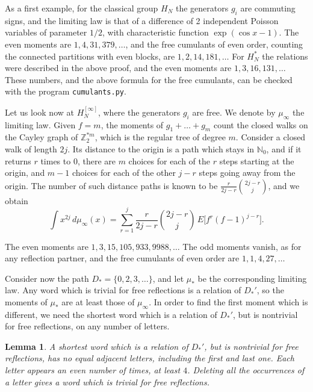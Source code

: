 \documentclass[11pt,a4paper]{article}
\newtheorem{lem}[thm]{Lemma}
\begin{document}
As a first example, for the classical group $H_N$ the generators $g_i$ are commuting signs, and the limiting law is that of a difference of 2 independent Poisson variables of parameter $1/2$, with characteristic function $\exp(\cos x-1)$. The even moments are $1,4,31,379,\ldots$, and the free cumulants of even order, counting the connected partitions with even blocks, are $1,2,14,181,\ldots$ For $H_N^*$ the relations were described in the above proof, and the even moments are $1,3,16,131,\ldots$ These numbers, and the above formula for the free cumulants, can be checked with the program \texttt{cumulants.py}.

Let us look now at $H_N^{[\infty]}$, where the generators $g_i$ are free. We denote by $\mu_\infty$ the limiting law. Given $f=m$, the moments of $g_1+\ldots+g_m$ count the closed walks on the Cayley graph of $\mathbb Z_2^{*m}$, which is the regular tree of degree $m$. Consider a closed walk of length $2j$. Its distance to the origin is a path which stays in $\mathbb N_0$, and if it returns $r$ times to $0$, there are $m$ choices for each of the $r$ steps starting at the origin, and $m-1$ choices for each of the other $j-r$ steps going away from the origin. The number of such distance paths is known to be $\frac{r}{2j-r}\binom{2j-r}{j}$, and we obtain
\[
 \int x^{2j}\,d\mu_\infty(x)=\sum_{r=1}^j\frac{r}{2j-r}\binom{2j-r}{j}\,E\big[f^r(f-1)^{j-r}\big].
\]

The even moments are $1,3,15,105,933,9988,\ldots$ The odd moments vanish, as for any reflection partner, and the free cumulants of even order are $1,1,4,27,\ldots$

Consider now the path $D_*=\{0,2,3,\ldots\}$, and let $\mu_*$ be the corresponding limiting law. Any word which is trivial for free reflections is a relation of $D_*'$, so the moments of $\mu_*$ are at least those of $\mu_\infty$. In order to find the first moment which is different, we need the shortest word which is a relation of $D_*'$, but is nontrivial for free reflections, on any number of letters.

\begin{lem}\label{shortest-path-word}
A shortest word which is a relation of $D_*'$, but is nontrivial for free reflections, has no equal adjacent letters, including the first and last one. Each letter appears an even number of times, at least $4$. Deleting all the occurrences of a letter gives a word which is trivial for free reflections.
\end{lem}
\end{document}
